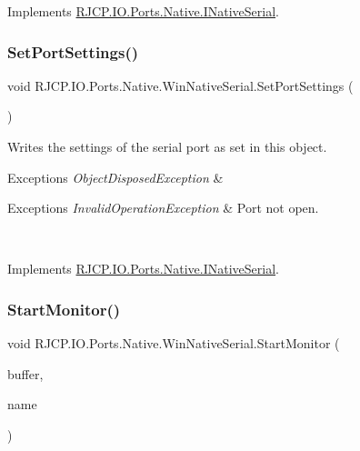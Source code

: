 Implements \mbox{\hyperlink{interface_r_j_c_p_1_1_i_o_1_1_ports_1_1_native_1_1_i_native_serial_aad8e5adb7a536fd4645f387003bed473}{R\+J\+C\+P.\+I\+O.\+Ports.\+Native.\+I\+Native\+Serial}}.

\mbox{\label{class_r_j_c_p_1_1_i_o_1_1_ports_1_1_native_1_1_win_native_serial_a662e00be7fe361aa0d49fb8530721f91}} 
\subsubsection{\texorpdfstring{SetPortSettings()}{SetPortSettings()}}
{\footnotesize\ttfamily void R\+J\+C\+P.\+I\+O.\+Ports.\+Native.\+Win\+Native\+Serial.\+Set\+Port\+Settings (\begin{DoxyParamCaption}{ }\end{DoxyParamCaption})}



Writes the settings of the serial port as set in this object. 


\begin{DoxyExceptions}{Exceptions}
{\em Object\+Disposed\+Exception} & 
\begin{DoxyExceptions}{Exceptions}
{\em Invalid\+Operation\+Exception} & Port not open.\\
\hline
\end{DoxyExceptions}
\\
\hline
\end{DoxyExceptions}


Implements \mbox{\hyperlink{interface_r_j_c_p_1_1_i_o_1_1_ports_1_1_native_1_1_i_native_serial_a56ae928a722facd5c4a885eee8c72455}{R\+J\+C\+P.\+I\+O.\+Ports.\+Native.\+I\+Native\+Serial}}.

\mbox{\label{class_r_j_c_p_1_1_i_o_1_1_ports_1_1_native_1_1_win_native_serial_af8513c10fdf373932ec07a2bb033d0c4}} 
\subsubsection{\texorpdfstring{StartMonitor()}{StartMonitor()}}
{\footnotesize\ttfamily void R\+J\+C\+P.\+I\+O.\+Ports.\+Native.\+Win\+Native\+Serial.\+Start\+Monitor (\begin{DoxyParamCaption}\item[{\mbox{\hyperlink{class_r_j_c_p_1_1_i_o_1_1_ports_1_1_native_1_1_serial_buffer}{Serial\+Buffer}}}]{buffer,  }\item[{string}]{name }\end{DoxyParamCaption})}




